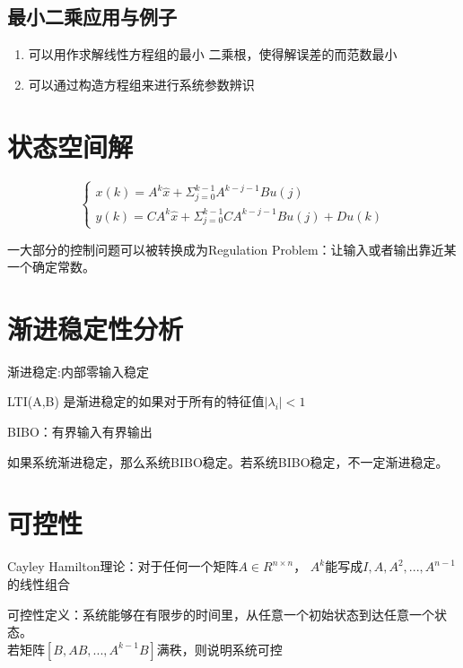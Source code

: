 \subsection{最小二乘应用与例子}
\begin{enumerate}
  \item 可以用作求解线性方程组的最小
二乘根，使得解误差的而范数最小
  \item 可以通过构造方程组来进行系统参数辨识
\end{enumerate}
\section{状态空间解}
\begin{theorembox}
	\begin{equation*}
	  \begin{cases}
		x(k) = A^k\hat{x} + \Sigma^{k-1}_{j=0} A^{k-j-1}Bu(j) \\
		y(k) = CA^k\hat{x} + \Sigma^{k-1}_{j=0} CA^{k-j-1} Bu(j) + Du(k)
	  \end{cases}
    \end{equation*}
\end{theorembox}

一大部分的控制问题可以被转换成为Regulation Problem：让输入或者输出靠近某一个确定常数。

\section{渐进稳定性分析}

渐进稳定:内部零输入稳定
\begin{theorembox}
	LTI(A,B) 是渐进稳定的如果对于所有的特征值$|\lambda _i| < 1$
\end{theorembox}

BIBO：有界输入有界输出
\begin{theorembox}
	如果系统渐进稳定，那么系统BIBO稳定。若系统BIBO稳定，不一定渐进稳定。
\end{theorembox}
\section{可控性}
\begin{theorembox}
	Cayley Hamilton理论：对于任何一个矩阵$A \in R^{n\times n}$， $A^k$能写成{$I,A,A^2, ... , A^{n-1}$}的线性组合
\end{theorembox}
\begin{theorembox}
	可控性定义：系统能够在有限步的时间里，从任意一个初始状态到达任意一个状态。\\
	若矩阵$[B, AB, ..., A^{k-1}B]$满秩，则说明系统可控
\end{theorembox}
